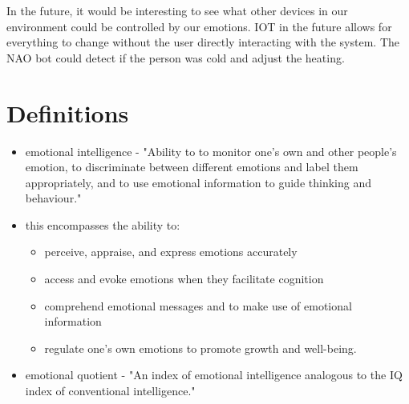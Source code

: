 \documentclass{lncs}
\begin{document}
In the future, it would be interesting to see what other devices in our environment could be controlled by our emotions. IOT in the future allows for everything to change without the user directly interacting with the system. The NAO bot could detect if the person was cold and adjust the heating.

\section*{Definitions}\label{sec:definitons}
\begin{itemize}
  \item emotional intelligence - "Ability to to monitor one's own and other people's emotion, to discriminate between different emotions and label them appropriately, and to use emotional information to guide thinking and behaviour." \cite{colman2015dictionary}
  \item this encompasses the ability to:
  \begin{itemize}
    \item perceive, appraise, and express emotions accurately
    \item access and evoke emotions when they facilitate cognition
    \item comprehend emotional messages and to make use of emotional information
    \item regulate one's own emotions to promote growth and well-being.
  \end{itemize}
  \item emotional quotient - "An index of emotional intelligence analogous to the IQ index of conventional intelligence." \cite{colman2015dictionary}
\end{itemize}

\nocite{*}


\end{document}

